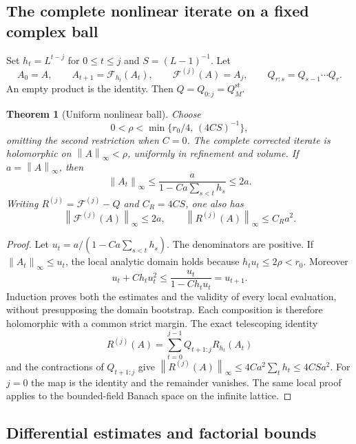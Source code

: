 \documentclass[11pt]{article}
\newtheorem{theorem}{Theorem}
\theoremstyle{remark}\newtheorem{remark}[theorem]{Remark}
\newcommand{\norm}[1]{\left\lVert#1\right\rVert}
\begin{document}
\subsection{The complete nonlinear iterate on a fixed complex ball}
\label{na-uniform-ball}

Set $h_t=L^{t-j}$ for $0\le t\le j$ and $S=(L-1)^{-1}$. Let
\[
 A_0=A,\qquad A_{t+1}=\mathcal F_{h_t}(A_t),\qquad
 \mathcal F^{(j)}(A)=A_j,
 \qquad Q_{r:s}=Q_{s-1}\cdots Q_r.
\]
An empty product is the identity. Then $Q=Q_{0:j}=Q_M^{\mathrm{st}}$.

\begin{theorem}[Uniform nonlinear ball]
\label{na-ball-theorem}
Choose
\begin{equation}
 0<\rho<\min\{r_0/4,\,(4CS)^{-1}\},
 \label{na-radius}
\end{equation}
omitting the second restriction when $C=0$. The complete corrected
iterate is holomorphic on $\norm{A}_\infty<\rho$, uniformly in
refinement and volume. If $a=\norm{A}_\infty$, then
\begin{equation}
 \norm{A_t}_\infty\le
 \frac{a}{1-Ca\sum_{s<t}h_s}\le2a.
 \label{na-riccati}
\end{equation}
Writing $R^{(j)}=\mathcal F^{(j)}-Q$ and $C_R=4CS$, one also has
\begin{equation}
 \norm{\mathcal F^{(j)}(A)}_\infty\le2a,
 \qquad \norm{R^{(j)}(A)}_\infty\le C_Ra^2.
 \label{na-composite-remainder}
\end{equation}
\end{theorem}

\begin{proof}
Let $u_t=a/(1-Ca\sum_{s<t}h_s)$. The denominators are positive.
If $\norm{A_t}_\infty\le u_t$, the local analytic domain holds
because $h_tu_t\le2\rho<r_0$. Moreover
\[
 u_t+Ch_tu_t^2\le\frac{u_t}{1-Ch_tu_t}=u_{t+1}.
\]
Induction proves both the estimates and the validity of every local
evaluation, without presupposing the domain bootstrap. Each
composition is therefore holomorphic with a common strict margin.
The exact telescoping identity
\[
 R^{(j)}(A)=\sum_{t=0}^{j-1}Q_{t+1:j}R_{h_t}(A_t)
\]
and the contractions of $Q_{t+1:j}$ give
$\norm{R^{(j)}(A)}_\infty\le4Ca^2\sum_t h_t\le4CSa^2$.
For $j=0$ the map is the identity and the remainder vanishes.
The same local proof applies to the bounded-field Banach space on
the infinite lattice.
\end{proof}

\subsection{Differential estimates and factorial bounds}
\label{na-differentials}
\end{document}
